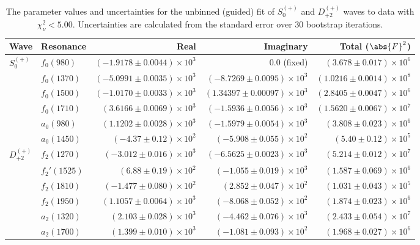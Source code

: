 \begin{table}[h]
    \begin{center}
        \begin{tabular}{llrrr}\toprule
        Wave & Resonance & Real & Imaginary & Total ($\abs{F}^2$) \\\midrule
$S_{0}^{(+)}$ & $f_{0}(980)$ & $(-1.9178 \pm 0.0044) \times 10^{3}$ & $0.0$ (fixed) & $(3.678 \pm 0.017) \times 10^{6}$ \\
 & $f_{0}(1370)$ & $(-5.0991 \pm 0.0035) \times 10^{3}$ & $(-8.7269 \pm 0.0095) \times 10^{3}$ & $(1.0216 \pm 0.0014) \times 10^{8}$ \\
 & $f_{0}(1500)$ & $(-1.0170 \pm 0.0033) \times 10^{3}$ & $(1.34397 \pm 0.00097) \times 10^{3}$ & $(2.8405 \pm 0.0047) \times 10^{6}$ \\
 & $f_{0}(1710)$ & $(3.6166 \pm 0.0069) \times 10^{3}$ & $(-1.5936 \pm 0.0056) \times 10^{3}$ & $(1.5620 \pm 0.0067) \times 10^{7}$ \\
 & $a_{0}(980)$ & $(1.1202 \pm 0.0028) \times 10^{3}$ & $(-1.5979 \pm 0.0054) \times 10^{3}$ & $(3.808 \pm 0.023) \times 10^{6}$ \\
 & $a_{0}(1450)$ & $(-4.37 \pm 0.12) \times 10^{2}$ & $(-5.908 \pm 0.055) \times 10^{2}$ & $(5.40 \pm 0.12) \times 10^{5}$ \\
$D_{+2}^{(+)}$ & $f_{2}(1270)$ & $(-3.012 \pm 0.016) \times 10^{3}$ & $(-6.5625 \pm 0.0023) \times 10^{3}$ & $(5.214 \pm 0.012) \times 10^{7}$ \\
 & $f_{2}'(1525)$ & $(6.88 \pm 0.19) \times 10^{2}$ & $(-1.055 \pm 0.019) \times 10^{3}$ & $(1.587 \pm 0.069) \times 10^{6}$ \\
 & $f_{2}(1810)$ & $(-1.477 \pm 0.080) \times 10^{2}$ & $(2.852 \pm 0.047) \times 10^{2}$ & $(1.031 \pm 0.043) \times 10^{5}$ \\
 & $f_{2}(1950)$ & $(1.1057 \pm 0.0064) \times 10^{3}$ & $(-8.068 \pm 0.052) \times 10^{2}$ & $(1.874 \pm 0.023) \times 10^{6}$ \\
 & $a_{2}(1320)$ & $(2.103 \pm 0.028) \times 10^{3}$ & $(-4.462 \pm 0.076) \times 10^{3}$ & $(2.433 \pm 0.054) \times 10^{7}$ \\
 & $a_{2}(1700)$ & $(1.399 \pm 0.010) \times 10^{3}$ & $(-1.081 \pm 0.093) \times 10^{2}$ & $(1.968 \pm 0.027) \times 10^{6}$ \\\bottomrule
        \end{tabular}
    \caption{The parameter values and uncertainties for the unbinned (guided) fit of $S_{0}^{(+)}$ and $D_{+2}^{(+)}$ waves to data with $\chi^2_\nu < 5.00$. Uncertainties are calculated from the standard error over $30$ bootstrap iterations.}\label{tab:unbinned-fit-chisqdof-5.0-guided-Sp0p-Dp2p}
    \end{center}
\end{table}
